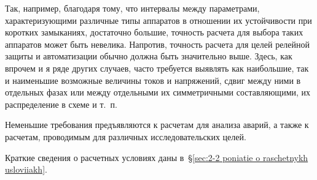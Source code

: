Так, например, благодаря тому, что интервалы между параметрами, характеризующими различные типы аппаратов в отношении их устойчивости при коротких замыканиях, достаточно большие, точность расчета для выбора таких аппаратов может быть невелика. Напротив, точность расчета для целей релейной защиты и автоматизации обычно должна быть значительно выше. Здесь, как впрочем и я ряде других случаев, часто требуется выявлять как наибольшие, так и наименьшие возможные величины токов и напряжений, сдвиг между ними в отдельных фазах или между отдельными их симметричными составляющими, их распределение в схеме и т.~п.

Неменьшие требования предъявляются к расчетам для анализа аварий, а также к расчетам, проводимым для различных исследовательских целей.

Краткие сведения о расчетных условиях даны в~§\ref{sec:2-2 poniatie o raschetnykh usloviiakh}.


















